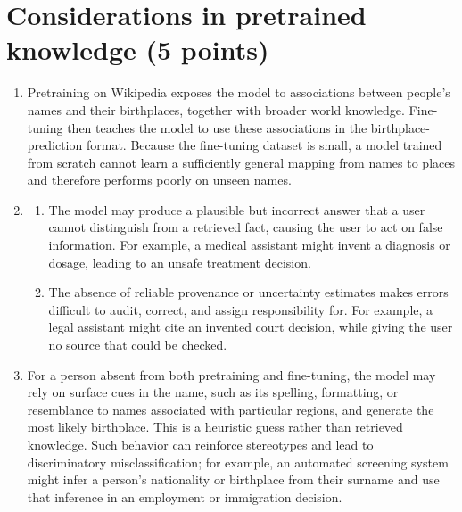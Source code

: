 \documentclass[11pt, a4paper, oneside]{article}
\begin{document}
\section{Considerations in pretrained knowledge (5 points)}
\begin{enumerate}[label=(\alph*), left=0pt, labelsep=1em, itemsep=1em]
    \item Pretraining on Wikipedia exposes the model to associations between
    people's names and their birthplaces, together with broader world
    knowledge. Fine-tuning then teaches the model to use these associations in
    the birthplace-prediction format. Because the fine-tuning dataset is small,
    a model trained from scratch cannot learn a sufficiently general mapping
    from names to places and therefore performs poorly on unseen names.

    \item
    \begin{enumerate}[label=\arabic*., left=0pt, labelsep=1em, itemsep=1em]
        \item The model may produce a plausible but incorrect answer that a
        user cannot distinguish from a retrieved fact, causing the user to act
        on false information. For example, a medical assistant might invent a
        diagnosis or dosage, leading to an unsafe treatment decision.
        \item The absence of reliable provenance or uncertainty estimates makes
        errors difficult to audit, correct, and assign responsibility for. For
        example, a legal assistant might cite an invented court decision, while
        giving the user no source that could be checked.
    \end{enumerate}

    \item For a person absent from both pretraining and fine-tuning, the model
    may rely on surface cues in the name, such as its spelling, formatting, or
    resemblance to names associated with particular regions, and generate the
    most likely birthplace. This is a heuristic guess rather than retrieved
    knowledge. Such behavior can reinforce stereotypes and lead to
    discriminatory misclassification; for example, an automated screening
    system might infer a person's nationality or birthplace from their surname
    and use that inference in an employment or immigration decision.
\end{enumerate}
\end{document}
